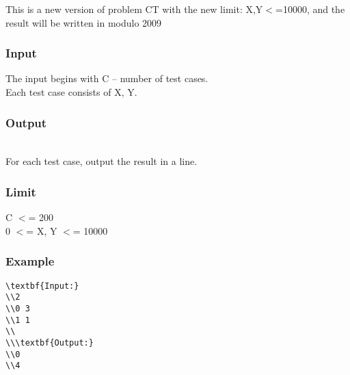 



   This is a new version of problem CT with the new limit: X,Y$<$=10000, and the result will be written in modulo 2009  

\subsubsection{   Input  }

   The input begins with C – number of test cases.   
\\   Each test case consists of X, Y.  

\subsubsection{   Output  }


\\   For each test case, output the result in a line.  

\subsubsection{   Limit  }

   C $<$= 200   
\\   0 $<$= X, Y $<$= 10000  

\subsubsection{   Example  }
\begin{verbatim}
\textbf{Input:}
\\2
\\0 3
\\1 1
\\
\\\textbf{Output:}
\\0
\\4\end{verbatim}
